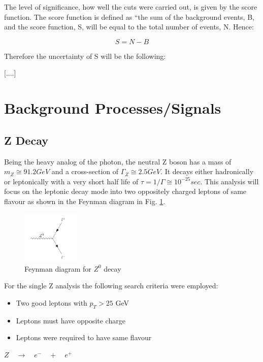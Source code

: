 \documentclass[runningheads,a4paper]{llncs}
\begin{document}
The level of significance, how well the cuts were carried out, is given by the score function. The score function is defined as “the sum of the background events, B, and the score function, S, will be equal to the total number of events, N. Hence:

\begin{equation}
S = N - B
\end{equation}

Therefore the uncertainty of S will be the following:

[....]


\section{Background Processes/Signals}

\subsection{Z Decay}

Being the heavy analog of the photon, the neutral Z boson has a mass of $m_{Z}\cong91.2 GeV$ and a cross-section of $\Gamma_{Z}\cong2.5 GeV$. It decays either hadronically or leptonically with a very short half life of $\tau = 1/\Gamma\cong{ 10 }^{ -25 }sec$. This analysis will focus on the leptonic decay mode into two oppositely charged leptons of same flavour as shown in the Feynman diagram in Fig. \ref{fig:feynmzll}.

\begin{figure}
\centering
\includegraphics[height=2.5cm]{feynm_Z}
\caption{Feynman diagram for ${Z}^{0}$ decay}
\label{fig:feynmzll}
\end{figure}

For the single Z analysis the following search criteria were employed:
\begin{itemize}
\item Two good leptons with ${p}_{T} > 25$ GeV
\item Leptons must have opposite charge
\item Leptons were required to have same flavour
\end{itemize}
\bigbreak
\textbf{$Z \quad \rightarrow \quad { e }^{ - } \quad + \quad { e }^{ + }$}
\end{document}
